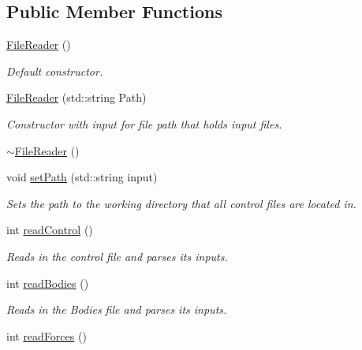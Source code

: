 \subsection*{Public Member Functions}
\begin{DoxyCompactItemize}
\item 
\hypertarget{classosea_1_1_file_reader_a615dcb2443cad1f2ca123c7c0c334480}{\hyperlink{classosea_1_1_file_reader_a615dcb2443cad1f2ca123c7c0c334480}{File\-Reader} ()}\label{classosea_1_1_file_reader_a615dcb2443cad1f2ca123c7c0c334480}

\begin{DoxyCompactList}\small\item\em Default constructor. \end{DoxyCompactList}\item 
\hyperlink{classosea_1_1_file_reader_a518fc07a4da5ff10374302fd253d3f45}{File\-Reader} (std\-::string Path)
\begin{DoxyCompactList}\small\item\em Constructor with input for file path that holds input files. \end{DoxyCompactList}\item 
\hyperlink{classosea_1_1_file_reader_a1382969e8f1468f3b04ad4b44ab39dee}{$\sim$\-File\-Reader} ()
\item 
void \hyperlink{classosea_1_1_file_reader_a0b12de2af52dc0cdfae5ab337bf494dc}{set\-Path} (std\-::string input)
\begin{DoxyCompactList}\small\item\em Sets the path to the working directory that all control files are located in. \end{DoxyCompactList}\item 
int \hyperlink{classosea_1_1_file_reader_a967cab6ec0822fd8bcf392873a8a82b1}{read\-Control} ()
\begin{DoxyCompactList}\small\item\em Reads in the control file and parses its inputs. \end{DoxyCompactList}\item 
int \hyperlink{classosea_1_1_file_reader_a44770836db4ab430139118727ace6547}{read\-Bodies} ()
\begin{DoxyCompactList}\small\item\em Reads in the Bodies file and parses its inputs. \end{DoxyCompactList}\item 
int \hyperlink{classosea_1_1_file_reader_ab78d2f631eb8e64b0a68d25eeca80be5}{read\-Forces} ()

\end{DoxyCompactItemize}
